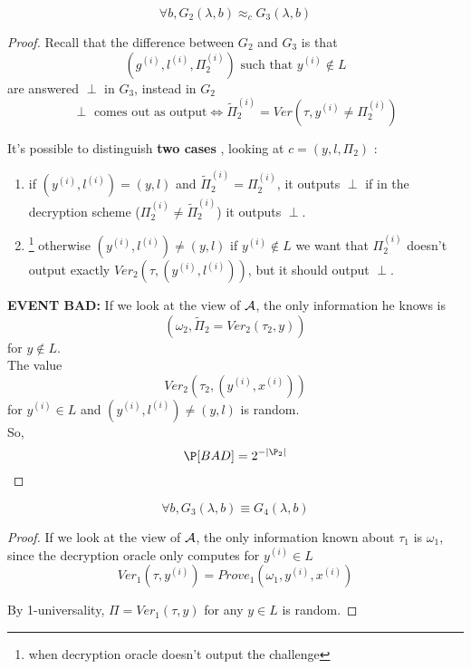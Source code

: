 \begin{lemma}
    \[
        \forall b, G_{2}(\lambda , b) \approx_{c} G_{3}(\lambda, b)
    \]
\end{lemma}
\begin{proof}
    Recall that the difference between $G_{2}$ and $G_{3}$ is that 
    \[
        (g^{(i)}, l^{(i)}, \Pi_{2}^{(i)})\text{ such that }y^{(i)}\not\in L 
    \]
    are answered $\perp$ in $G_{3}$, instead in $G_{2}$
    \[
        \perp \text{ comes out as output} \Leftrightarrow
        \tilde{\Pi}^{(i)}_{2}=Ver(\tau, y^{(i)}\not=\Pi^{(i)}_{2})
    \]

    It's possible to distinguish \textbf{two cases} , looking at $c=(y, l,
    \Pi_{2})$ :
\begin{enumerate}
    \item if $(y^{(i)}, l^{(i)})=(y,l)$ and $\tilde{\Pi}^{(i)}_{2}=\Pi^{(i)}_{2}$, it outputs $\perp$ if in the decryption scheme ($\Pi^{(i)}_{2} \not= \tilde{\Pi}^{(i)}_{2}$) it outputs $\perp$.

    \item \footnote{when decryption oracle doesn't output the challenge} otherwise $(y^{(i)}, l^{(i)})\not= (y,l)$ if $y^{(i)}\not\in L$ we want that $\Pi^{(i)}_{2}$ doesn't output exactly $Ver_{2}(\tau, (y^{(i)}, l^{(i)}))$, but it should output $\perp$.
\end{enumerate}

\textbf{EVENT BAD:} If we look at the view of $\mathcal{A}$, the only information he
knows is 
\[
    (\omega_{2}, \tilde{\Pi}_{2}=Ver_{2}(\tau_{2}, y))
\]
for $y \not\in L$.\\
The value 
\[
Ver_{2}(\tau_{2}, (y^{(i)}, x^{(i)}))
\]
for $y^{(i)} \in L$ and
$(y^{(i)}, l^{(i)})\not=(y, l)$ is random.\\
So, 
\[
\P [ BAD ] =2^{-|\P_{2}|} 
\]

\end{proof}

\begin{lemma}
    \[
        \forall b , G_{3}(\lambda, b)\equiv G_{4}(\lambda, b)   
    \]
\end{lemma}

\begin{proof}
    If we look at the view of $\mathcal{A}$, the only information known about $\tau_{1}$
    is $\omega_{1}$, since the decryption oracle only computes for $y^{(i)} \in
    L$
    \[
        Ver_{1}(\tau, y^{(i)})=Prove_{1}(\omega_{1}, y^{(i)}, x^{(i)})
    \]

    By 1-universality, $\Pi=Ver_{1}(\tau ,y)$ for any $y \in L$ is random.
\end{proof}

